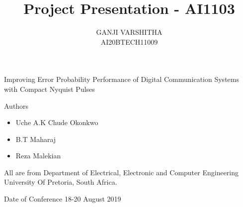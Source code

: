 \documentclass[10pt]{beamer}
\title{\textbf{Project Presentation - AI1103}}
\author{GANJI VARSHITHA\\ AI20BTECH11009}
\date{}
\begin{document}
\begin{frame}
\titlepage
\end{frame}
\section{}
\begin{frame}{Improving Error Probability Performance of Digital
Communication Systems with Compact Nyquist Pulses }
\begin{block}{Authors}
\begin{itemize}
\item Uche A.K Chude Okonkwo
\item B.T Maharaj
\item Reza Malekian
\end{itemize}
All are from Department of Electrical, Electronic and Computer Engineering University Of Pretoria, South Africa.
\end{block}
\begin{block}{Date of Conference}
18-20 August 2019
\end{block}
\end{frame}
\end{document}
